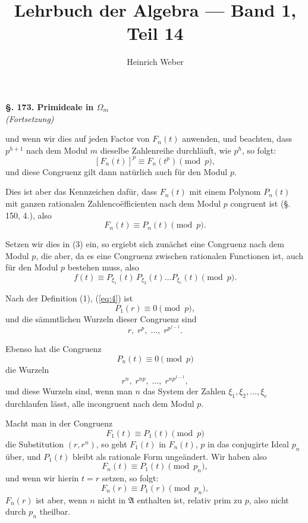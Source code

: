 \documentclass[12pt,a4paper]{article}
\title{Lehrbuch der Algebra --- Band 1, Teil 14}
\author{Heinrich Weber}
\date{}
\begin{document}
\maketitle

\noindent\textbf{\S. 173. Primideale in $\Omega_m$}\\[4pt]
\noindent\textit{(Fortsetzung)}

\bigskip\noindent und wenn wir dies auf jeden Factor von $F_n(t)$ anwenden, und beachten, dass $p^{h+1}$ nach dem Modul $m$ dieselbe Zahlenreihe durchläuft, wie $p^h$, so folgt:
\[
[F_n(t)]^p \equiv F_n(t^p) \pmod{p},
\]
und diese Congruenz gilt dann natürlich auch für den Modul $p$.

Dies ist aber das Kennzeichen dafür, dass $F_n(t)$ mit einem Polynom $P_n(t)$ mit ganzen rationalen Zahlencoëfficienten nach dem Modul $p$ congruent ist (\S. 150, 4.), also
\begin{equation}\label{eq:4}
F_n(t) \equiv P_n(t) \pmod{p}.
\end{equation}

Setzen wir dies in (3) ein, so ergiebt sich zunächst eine Congruenz nach dem Modul $p$, die aber, da es eine Congruenz zwischen rationalen Functionen ist, auch für den Modul $p$ bestehen muss, also
\begin{equation}\label{eq:5}
f(t) \equiv P_{\xi_1}(t)\, P_{\xi_2}(t) \ldots P_{\xi_e}(t) \pmod{p}.
\end{equation}

Nach der Definition (1), (\ref{eq:4}) ist
\begin{equation}\label{eq:6}
P_1(r) \equiv 0 \pmod{p},
\end{equation}
und die sämmtlichen Wurzeln dieser Congruenz sind
\begin{equation}\label{eq:7}
r,\; r^p,\; \ldots,\; r^{p^{f-1}}.
\end{equation}

Ebenso hat die Congruenz
\[
P_n(t) \equiv 0 \pmod{p}
\]
die Wurzeln
\[
r^n,\; r^{np},\; \ldots,\; r^{np^{f-1}},
\]
und diese Wurzeln sind, wenn man $n$ das System der Zahlen $\xi_1, \xi_2, \ldots, \xi_e$ durchlaufen lässt, alle incongruent nach dem Modul $p$.

Macht man in der Congruenz
\[
F_1(t) \equiv P_1(t) \pmod{p}
\]
die Substitution $(r, r^n)$, so geht $F_1(t)$ in $F_n(t)$, $p$ in das conjugirte Ideal $p_n$ über, und $P_1(t)$ bleibt als rationale Form ungeändert. Wir haben also
\begin{equation}\label{eq:8}
F_n(t) \equiv P_1(t) \pmod{p_n},
\end{equation}
und wenn wir hierin $t = r$ setzen, so folgt:
\begin{equation}\label{eq:9}
F_n(r) \equiv P_1(r) \pmod{p_n},
\end{equation}
$F_n(r)$ ist aber, wenn $n$ nicht in $\mathfrak{A}$ enthalten ist, relativ prim zu $p$, also nicht durch $p_n$ theilbar.
\end{document}
